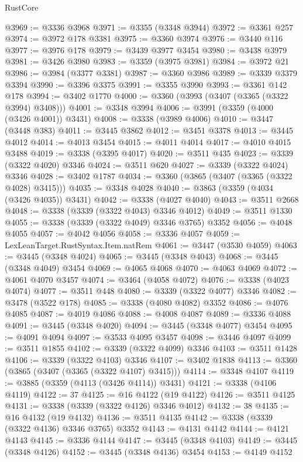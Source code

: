 \begin{lexlean}{RustCore}
\begin{coremodule}
@3969 := @3336 @3968
@3971 := @3355 (@3348 @3944)
@3972 := @3361 @257
@3974 := @3972 @178 @3381
@3975 := @3360 @3974
@3976 := @3440 @116
@3977 := @3976 @178
@3979 := @3439 @3977 @3454
@3980 := @3438 @3979
@3981 := @3426 @3980
@3983 := @3359 (@3975 @3981)
@3984 := @3972 @21
@3986 := @3984 (@3377 @3381)
@3987 := @3360 @3986
@3989 := @3339 @3379 @3394
@3990 := @3396 @3375
@3991 := @3355 @3990
@3993 := @3361 @142 @178
@3994 := @3402 @1770
@4000 := @3360 (@3993 (@3407 (@3365 (@3322 @3994) @3408)))
@4001 := @3348 @3994
@4006 := @3991 (@3359 (@4000 (@3426 @4001)) @3431)
@4008 := @3338 (@3989 @4006)
@4010 := @3447 (@3448 @383)
@4011 := @3445 @3862
@4012 := @3451 @3378
@4013 := @3445 @4012
@4014 := @4013 @3454
@4015 := @4011 @4014
@4017 := @4010 @4015 @3488
@4019 := @3338 (@3395 @4017)
@4020 := @3511 @435
@4023 := @3339 (@3322 @4020) @3346
@4024 := @3511 @620
@4027 := @3339 (@3322 @4024) @3346
@4028 := @3402 @1787
@4034 := @3360 (@3865 (@3407 (@3365 (@3322 @4028) @3415)))
@4035 := @3348 @4028
@4040 := @3863 (@3359 (@4034 (@3426 @4035)) @3431)
@4042 := @3338 (@4027 @4040)
@4043 := @3511 @2668
@4048 := @3338 (@3339 (@3322 @4043) @3346 @4012)
@4049 := @3511 @1330
@4055 := @3338 (@3339 (@3322 @4049) @3346 @3765) @3352
@4056 := @4048 @4055
@4057 := @4042 @4056
@4058 := @3336 @4057
@4059 := LexLeanTarget.RustSyntax.Item.natRem
@4061 := @3447 (@3530 @4059)
@4063 := @3445 (@3348 @4024)
@4065 := @3445 (@3348 @4043)
@4068 := @3445 (@3348 @4049) @3454
@4069 := @4065 @4068
@4070 := @4063 @4069
@4072 := @4061 @4070 @3457
@4074 := @3464 (@4058 @4072)
@4076 := @3338 (@4023 @4074)
@4077 := @3511 @448
@4080 := @3339 (@3322 @4077) @3346
@4082 := @3478 (@3522 @178)
@4085 := @3338 (@4080 @4082) @3352
@4086 := @4076 @4085
@4087 := @4019 @4086
@4088 := @4008 @4087
@4089 := @3336 @4088
@4091 := @3445 (@3348 @4020)
@4094 := @3445 (@3348 @4077) @3454
@4095 := @4091 @4094
@4097 := @3533 @4095 @3457
@4098 := @3446 @4097
@4099 := @3511 @1855
@4102 := @3339 (@3322 @4099) @3346
@4103 := @3511 @1428
@4106 := @3339 (@3322 @4103) @3346
@4107 := @3402 @1838
@4113 := @3360 (@3865 (@3407 (@3365 (@3322 @4107) @3415)))
@4114 := @3348 @4107
@4119 := @3885 (@3359 (@4113 (@3426 @4114)) @3431)
@4121 := @3338 (@4106 @4119)
@4122 := 37
@4125 := @16 @4122 (@19 @4122)
@4126 := @3511 @4125
@4131 := @3338 (@3339 (@3322 @4126) @3346 @4012)
@4132 := 38
@4135 := @16 @4132 (@19 @4132)
@4136 := @3511 @4135
@4142 := @3338 (@3339 (@3322 @4136) @3346 @3765) @3352
@4143 := @4131 @4142
@4144 := @4121 @4143
@4145 := @3336 @4144
@4147 := @3445 (@3348 @4103)
@4149 := @3445 (@3348 @4126)
@4152 := @3445 (@3348 @4136) @3454
@4153 := @4149 @4152

\end{coremodule}
\end{lexlean}
